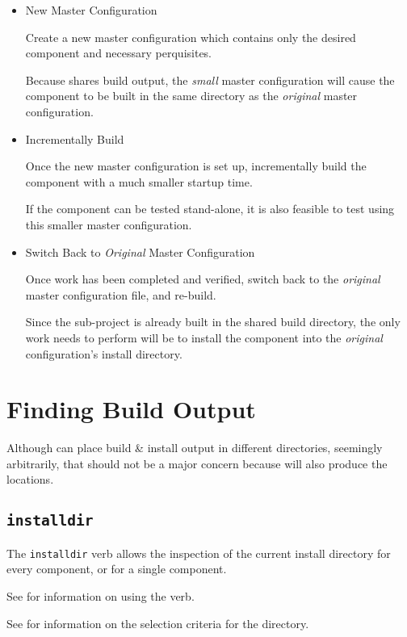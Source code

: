 \begin{itemize}
\item New Master Configuration

  Create a new master configuration which contains only the desired
  component and necessary perquisites.

  Because \lmsbw shares build output, the \emph{small} master
  configuration will cause the component to be built in the same
  directory as the \emph{original} master configuration.

\item Incrementally Build

  Once the new master configuration is set up, incrementally build the
  component with a much smaller startup time.

  If the component can be tested stand-alone, it is also feasible to
  test using this smaller master configuration.

\item Switch Back to \emph{Original} Master Configuration

  Once work has been completed and verified, switch back to the
  \emph{original} master configuration file, and re-build.

  Since the sub-project is already built in the shared build
  directory, the only work \lmsbw needs to perform will be to install
  the component into the \emph{original} configuration's install
  directory.
\end{itemize}

\section{Finding Build Output}

Although \lmsbw can place build \& install output in different
directories, seemingly arbitrarily, that should not be a major concern
because \lmsbw will also produce the locations.

\subsection{\texttt{installdir}}

The \lmsbw \texttt{installdir} verb allows the inspection of the
current install directory for every component, or for a single
component.

See  for information on using the verb.

See  for information on the
selection criteria for the directory.

